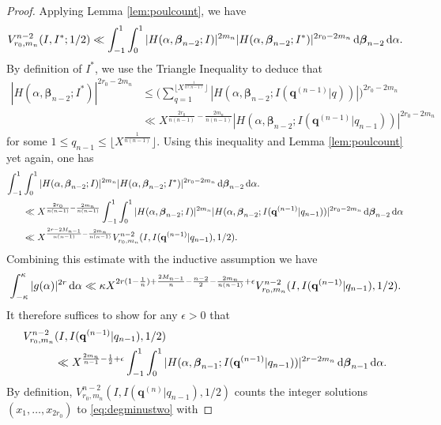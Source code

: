 \documentclass[11pt,reqno]{amsart}
\numberwithin{equation}{section}
\renewcommand{\d}{\,{\rm d}}
\begin{document}
\begin{proof}
Applying Lemma \ref{lem:poulcount}, we have 
\[ V_{r_0,m_n}^{n-2}(I, I^* ;1/2) \ll \int_{-1}^{1} \int_{0}^{1} |H(\alpha,\boldsymbol{\beta}_{n-2};I )|^{2m_n} |H(\alpha,\boldsymbol{\beta}_{n-2};I^* )|^{2r_0-2m_n} \d \boldsymbol{\beta}_{n-2} \d \alpha. \]
By definition of $I^*$, we use the Triangle Inequality to deduce that 
\begin{align*} |H(\alpha,\boldsymbol{\beta}_{n-2};I^* )|^{2r_0-2m_n} & \leq \Big( \sum_{q = 1}^{\lfloor X^{\frac{1}{n(n-1)}} \rfloor} |H(\alpha,\boldsymbol{\beta}_{n-2};I({\mathbf{q}^{(n-1)}|q}) )|  \Big)^{2r_0-2m_n}
\\ 
& \ll X^{\frac{2r_0}{n(n-1)}-\frac{2m_n}{n(n-1)}} |H(\alpha,\boldsymbol{\beta}_{n-2};I({\mathbf{q}^{(n-1)}|q_{n-1}}) )|^{2r_0-2m_n}
\end{align*}
for some $1 \leq q_{n-1} \leq \lfloor X^{\frac{1}{n(n-1)}} \rfloor$. Using this inequality and Lemma \ref{lem:poulcount} yet again, one has 
\begin{align*} 
\int_{-1}^{1} & \int_{0}^{1} |H(\alpha,\boldsymbol{\beta}_{n-2};I )|^{2m_n} |H(\alpha,\boldsymbol{\beta}_{n-2};I^* )|^{2r_0-2m_n} \d \boldsymbol{\beta}_{n-2} \d \alpha.
\\ 
& \ll X^{\frac{2r_0}{n(n-1)}-\frac{2m_n}{n(n-1)}} \int_{-1}^{1} \int_{0}^{1} |H(\alpha,\boldsymbol{\beta}_{n-2};I )|^{2m_n} |H(\alpha,\boldsymbol{\beta}_{n-2};I({\mathbf{q}^{(n-1)}|q_{n-1}}) )|^{2r_0-2m_n} \d \boldsymbol{\beta}_{n-2} \d \alpha 
\\ 
& \ll X^{\frac{2r-2M_{n-1}}{n(n-1)}-\frac{2m_n}{n(n-1)}} V_{r_0,m_n}^{n-2}(I,I({\mathbf{q}^{(n-1)}|q_{n-1}}),1/2).
\end{align*}
Combining this estimate with the inductive assumption we have 
\begin{align*} 
\int_{-\kappa}^{\kappa} |g(\alpha)|^{2r} \d\alpha \ll \kappa X^{2r(1-\frac{1}{n})+\frac{2M_{n-1}}{n}-\frac{n-2}{2}-\frac{2m_{n}}{n(n-1)}+\epsilon} V_{r_0,m_n}^{n-2}(I,I({\mathbf{q}^{(n-1)}|q_{n-1}}),1/2). 
\end{align*}
It therefore suffices to show for any $\epsilon > 0$ that 
\begin{align*} V_{r_0,m_n}^{n-2} & (I,I({\mathbf{q}^{(n-1)}|q_{n-1}}),1/2) 
\\ 
& \ll X^{\frac{2m_n}{n-1}-\frac{1}{2}+\epsilon} \int_{-1}^{1} \int_{0}^{1} |H(\alpha,\boldsymbol{\beta}_{n-1};I({\mathbf{q}^{(n-1)}|q_{n-1}}) )|^{2r-2m_n} \d \boldsymbol{\beta}_{n-1} \d \alpha. 
\end{align*}
By definition, $V_{r_0,m_n}^{n-2}(I,I({\mathbf{q}^{(n)}|q_{n-1}}),1/2)$ counts the integer solutions $(x_1,\ldots,x_{2r_0})$ to \eqref{eq:degminustwo} with 

\end{proof}
\end{document}
